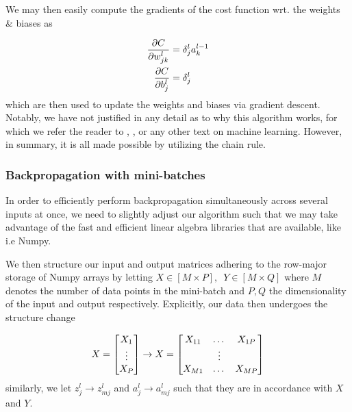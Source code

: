 \documentclass[reprint, english, nofootinbib]{revtex4-2}
\begin{document}
We may then easily compute the gradients of the cost function wrt. the weights \& biases as

\begin{align}
    \begin{split}
        \pdv{C}{w_{jk}^l} &= \delta_j^l a^{l-1}_k \\
        \pdv{C}{b^l_j} &= \delta_j^l
    \end{split}
\end{align}
which are then used to update the weights and biases via gradient descent. Notably, we have not justified in any detail as to why this algorithm works, for which we refer the reader to \textcite{Mehta_2019}, \textcite{hastie}, or any other text on machine learning. However, in summary, it is all made possible by utilizing the chain rule.

\subsubsection{Backpropagation with mini-batches}
\noindent
In order to efficiently perform backpropagation simultaneously across several inputs at once, we need to slightly adjust our algorithm such that we may take advantage of the fast and efficient linear algebra libraries that are available, like i.e Numpy.

We then structure our input and output matrices adhering to the row-major storage of Numpy arrays by letting $X\in[M\times P], \enspace Y\in[M\times Q]$ where $M$ denotes the number of data points in the mini-batch and $P, Q$ the dimensionality of the input and output respectively. Explicitly, our data then undergoes the structure change

\begin{equation}
    X = \qty[
    \begin{matrix}
        X_1 \\ \vdots \\ X_P
    \end{matrix}
    ] \rightarrow
    X = \qty[
    \begin{matrix}
        X_{11} & \dots & X_{1P} \\
                 & \vdots&          \\
        X_{M1} & \dots & X_{MP}
    \end{matrix}
    ]
\end{equation}
similarly, we let $z^l_j \rightarrow z^l_{mj}$ and $a^l_{j}\rightarrow a^l_{mj}$ such that they are in accordance with $X$ and $Y$.
\end{document}
